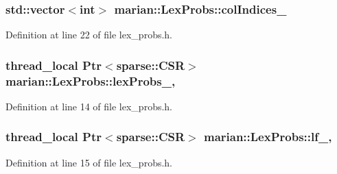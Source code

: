 \subsubsection[{\texorpdfstring{col\+Indices\+\_\+}{colIndices_}}]{\setlength{\rightskip}{0pt plus 5cm}std\+::vector$<$int$>$ marian\+::\+Lex\+Probs\+::col\+Indices\+\_\+\hspace{0.3cm}{\ttfamily [private]}}\hypertarget{classmarian_1_1LexProbs_af46061a0c4104dce0c8da7d91f014f44}{}\label{classmarian_1_1LexProbs_af46061a0c4104dce0c8da7d91f014f44}


Definition at line 22 of file lex\+\_\+probs.\+h.

\subsubsection[{\texorpdfstring{lex\+Probs\+\_\+}{lexProbs_}}]{\setlength{\rightskip}{0pt plus 5cm}thread\+\_\+local {\bf Ptr}$<${\bf sparse\+::\+C\+SR}$>$ marian\+::\+Lex\+Probs\+::lex\+Probs\+\_\+\hspace{0.3cm}{\ttfamily [static]}, {\ttfamily [private]}}\hypertarget{classmarian_1_1LexProbs_a58752d3501db781924b464b19d0d3af2}{}\label{classmarian_1_1LexProbs_a58752d3501db781924b464b19d0d3af2}


Definition at line 14 of file lex\+\_\+probs.\+h.

\subsubsection[{\texorpdfstring{lf\+\_\+}{lf_}}]{\setlength{\rightskip}{0pt plus 5cm}thread\+\_\+local {\bf Ptr}$<${\bf sparse\+::\+C\+SR}$>$ marian\+::\+Lex\+Probs\+::lf\+\_\+\hspace{0.3cm}{\ttfamily [static]}, {\ttfamily [private]}}\hypertarget{classmarian_1_1LexProbs_a65bfae71dcdadf29398ab31ab855065c}{}\label{classmarian_1_1LexProbs_a65bfae71dcdadf29398ab31ab855065c}


Definition at line 15 of file lex\+\_\+probs.\+h.

